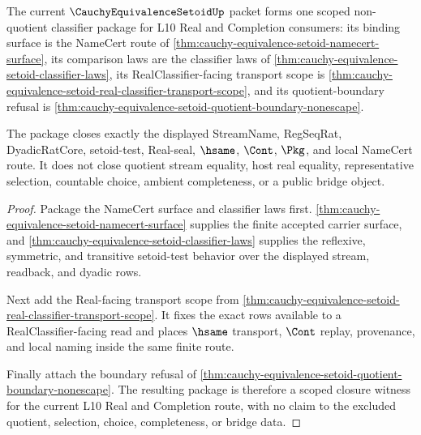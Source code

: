 \begin{theorem}
\label{thm:cauchy-equivalence-setoid-scoped-closure-package}
The current $\CauchyEquivalenceSetoidUp$ packet forms one scoped non-quotient classifier package for L10 Real and Completion consumers: its binding surface is the NameCert route of \autoref{thm:cauchy-equivalence-setoid-namecert-surface}, its comparison laws are the classifier laws of \autoref{thm:cauchy-equivalence-setoid-classifier-laws}, its RealClassifier-facing transport scope is \autoref{thm:cauchy-equivalence-setoid-real-classifier-transport-scope}, and its quotient-boundary refusal is \autoref{thm:cauchy-equivalence-setoid-quotient-boundary-nonescape}.

The package closes exactly the displayed StreamName, RegSeqRat, DyadicRatCore, setoid-test, Real-seal, $\hsame$, $\Cont$, $\Pkg$, and local NameCert route. It does not close quotient stream equality, host real equality, representative selection, countable choice, ambient completeness, or a public bridge object.
\end{theorem}
\begin{proof}
Package the NameCert surface and classifier laws first. \autoref{thm:cauchy-equivalence-setoid-namecert-surface} supplies the finite accepted carrier surface, and \autoref{thm:cauchy-equivalence-setoid-classifier-laws} supplies the reflexive, symmetric, and transitive setoid-test behavior over the displayed stream, readback, and dyadic rows.

Next add the Real-facing transport scope from \autoref{thm:cauchy-equivalence-setoid-real-classifier-transport-scope}. It fixes the exact rows available to a RealClassifier-facing read and places $\hsame$ transport, $\Cont$ replay, provenance, and local naming inside the same finite route.

Finally attach the boundary refusal of \autoref{thm:cauchy-equivalence-setoid-quotient-boundary-nonescape}. The resulting package is therefore a scoped closure witness for the current L10 Real and Completion route, with no claim to the excluded quotient, selection, choice, completeness, or bridge data.
\end{proof}

